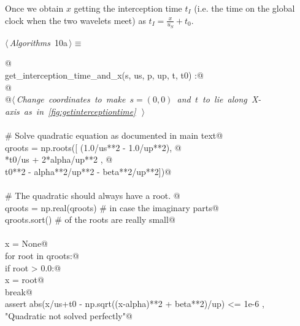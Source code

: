 \documentclass[10pt, english, oneside]{report}
\begin{document}
Once we obtain $x$ getting the interception time $t_I$ (i.e. the time on the global clock 
when the two wavelets meet) as $t_I = \frac{x}{u_S} + t_0$.

\begin{flushleft} \small
\begin{minipage}{\linewidth}\label{scrap6}\raggedright\small
{} $\langle\,${\itshape Algorithms}\nobreak\ {\footnotesize {10a}}$\,\rangle\equiv$
\vspace{-1ex}
\begin{list}{}{} \item
\mbox{}\verb@ @\\
\mbox{}\verb@def get_interception_time_and_x(s, us, p, up, t, t0) :@\\
\mbox{}\verb@    @\\
\mbox{}\verb@    @\hbox{$\langle\,${\itshape Change coordinates to make $s=(0,0)$ and $t$ to lie along X-axis as in \autoref{fig:getinterceptiontime}}\nobreak\ {\footnotesize {}}$\,\rangle$}\verb@@\\
\mbox{}\verb@@\\
\mbox{}\verb@    # Solve quadratic equation as documented in main text@\\
\mbox{}\verb@    qroots = np.roots([ (1.0/us**2 - 1.0/up**2), @\\
\mbox{}*t0/us + 2*alpha/up**2 , @\\
\mbox{}\verb@                        t0**2 - alpha**2/up**2 - beta**2/up**2])@\\
\mbox{}\verb@@\\
\mbox{}\verb@    # The quadratic should always have a root. @\\
\mbox{}\verb@    qroots = np.real(qroots) # in case the imaginary parts@\\
\mbox{}\verb@    qroots.sort()            # of the roots are really small@\\
\mbox{}\verb@@\\
\mbox{}\verb@    x = None@\\
\mbox{}\verb@    for root in qroots:@\\
\mbox{}\verb@        if root > 0.0:@\\
\mbox{}\verb@           x = root@\\
\mbox{}\verb@           break@\\
\mbox{}\verb@    assert abs(x/us+t0 - np.sqrt((x-alpha)**2 + beta**2)/up) <= 1e-6 , \@\\
\mbox{}\verb@           "Quadratic not solved perfectly"@\\

\end{list}
\end{minipage}
\end{flushleft}
\end{document}

